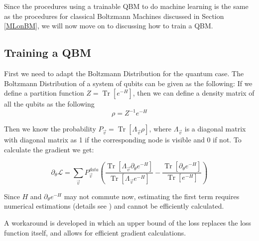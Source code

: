 \documentclass[letterpaper,11pt]{article}
\DeclareMathOperator{\Tr}{Tr}
\begin{document}
Since the procedures using a trainable QBM to do machine learning is the same as the procedures for classical Boltzmann Machines discussed in Section \ref{MLonBM}, we will now move on to discussing how to train a QBM.  

\subsection{Training a QBM}
First we need to adapt the Boltzmann Distribution for the quantum case. The Boltzmann Distribution of a system of qubits can be given as the following: If we define a partition function $Z = \Tr[e^{-H}]$, then we can define a density matrix of all the qubits as the following
\begin{equation}
\rho = Z^{-1} e^{-H}
\end{equation} \par

Then we know the probability $P_{\vec{v}} = \Tr [\Lambda_{\vec{v}} \rho]$, where $\Lambda_{\vec{v}}$ is a diagonal matrix with diagonal matrix as 1 if the corresponding node is visible and 0 if not. To calculate the gradient we get:

\begin{equation}
\partial_{\theta} \mathcal{L} = \sum_{\vec{v}} P_{\vec{v}}^{data} (\frac{ \Tr[\Lambda_{\vec{v}} \partial_{\theta} e ^ {-H}]}{\Tr[\Lambda_{\vec{v}} e ^ {-H}]} - \frac{\Tr[\partial_{\theta} e^{-H}]}{\Tr[e^{-H}]})
\end{equation}

Since $H$ and $\partial_{\theta} e^{-H}$ may not commute now, estimating the first term requires numerical estimations (details see \cite{QBM}) and cannot be efficiently calculated. \par

A workaround is developed in which an upper bound of the loss replaces the loss function itself, and allows for efficient gradient calculations. \par
\end{document}
